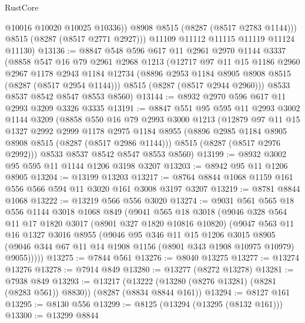 \begin{lexlean}{RustCore}
\begin{coremodule}
              @10016
              @10020
              @10025
              @10336))
          @8908
          @8515
          (@8287 (@8517 @2783 @1144)))
        @8515
        (@8287 (@8517 @2771 @2927)))
      @11109
      @11112
      @11115
      @11119
      @11124
      @11130)
@13136 := @8847
    @548
    @596
    @617
    @11
    @2961
    @2970
    @1144
    @3337
    (@8858
      @547
      @16
      @79
      @2961
      @2968
      @1213
      (@12717
        @97
        @11
        @15
        @1186
        @2960
        @2967
        @1178
        @2943
        @1184
        @12734
        (@8896 @2953 @1184 @8905 @8908 @8515 (@8287 (@8517 @2954 @1144)))
        @8515
        (@8287 (@8517 @2944 @2960)))
      @8533
      @8537
      @8542
      @8547
      @8553
      @8560)
@13144 := @8932 @2970 @596 @617 @11 @2993 @3209 @3326 @3335
@13191 := @8847
    @551
    @95
    @595
    @11
    @2993
    @3002
    @1144
    @3209
    (@8858
      @550
      @16
      @79
      @2993
      @3000
      @1213
      (@12879
        @97
        @11
        @15
        @1327
        @2992
        @2999
        @1178
        @2975
        @1184
        @8955
        (@8896 @2985 @1184 @8905 @8908 @8515 (@8287 (@8517 @2986 @1144)))
        @8515
        (@8287 (@8517 @2976 @2992)))
      @8533
      @8537
      @8542
      @8547
      @8553
      @8560)
@13199 := @8932 @3002 @95 @595 @11 @1144 @1206 @3198 @3207
@13203 := @8942 @95 @11 @1206 @8905
@13204 := @13199 @13203
@13217 := @8764 @8844 @1068 @1159 @161 @556 @566 @594 @11 @3020 @161 @3008 @3197 @3207
@13219 := @8781 @8844 @1068
@13222 := @13219 @566 @556 @3020
@13274 := @9031
    @561
    @565
    @18
    @556
    @1144
    @3018
    @1068
    @849
    (@9041
      @565
      @18
      @3018
      (@9046
        @328
        @564
        @11
        @17
        @1820
        @3017
        (@8901 @327 @1820 @10816 @10820)
        (@9047
          @563
          @11
          @16
          @1327
          @3016
          @8955
          (@9046
            @95
            @346
            @11
            @15
            @1206
            @3015
            @8905
            (@9046 @344 @67 @11 @14 @1908 @1156 (@8901 @343 @1908 @10975 @10979) @9055)))))
@13275 := @7844 @561
@13276 := @8040 @13275
@13277 := @13274 @13276
@13278 := @7914 @849
@13280 := @13277 (@8272 @13278)
@13281 := @7938 @849
@13293 := @13217
    (@13222 (@13280 (@8276 @13281) (@8281 (@8283 @561)) @8830))
    (@8287 (@8834 @8844 @161))
@13294 := @8127 @161
@13295 := @8130 @556
@13299 := @8125 (@13294 (@13295 (@8132 @161)))
@13300 := @13299 @8844

\end{coremodule}
\end{lexlean}
